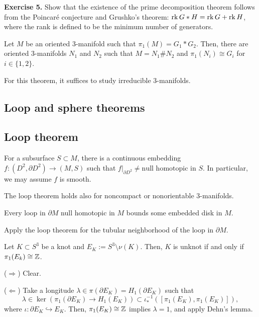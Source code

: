 \documentclass{../../small}
\begin{document}
\noindent\textbf{Exercise 5.} Show that the existence of the prime decomposition theorem follows from the Poincar\'e conjecture and Grushko's theorem: $\operatorname{rk} G*H=\operatorname{rk} G+\operatorname{rk} H$, where the rank is defined to be the minimum number of generators.

\begin{thm}
Let $M$ be an oriented 3-manifold such that $\pi_1(M)=G_1*G_2$.
Then, there are oriented 3-manifolds $N_1$ and $N_2$ such that $M=N_1\#N_2$ and $\pi_1(N_i)\cong G_i$ for $i\in\{1,2\}$.
\end{thm}
For this theorem, it suffices to study irreducible 3-manifolds.




\setcounter{section}{4}
\setcounter{subsection}{0}
\setcounter{thm}{0}
\subsection*{Loop and sphere theorems}
\subsection{Loop theorem}

\begin{thm}
For a subsurface $S\subset M$, there is a continuous embedding $f:(D^2,\partial D^2)\to(M,S)$ such that $f|_{\partial D^2}\ne\text{null homotopic in }S$.
In particular, we may assume $f$ is smooth.
\end{thm}

\begin{rmk*}
The loop theorem holds also for noncompact or nonorientable 3-manifolds.
\end{rmk*}

\begin{cor}
Every loop in $\partial M$ null homotopic in $M$ bounds some embedded disk in $M$.
\end{cor}
\begin{pf}
Apply the loop theorem for the tubular neighborhood of the loop in $\partial M$.
\end{pf}

\begin{thm}
Let $K\subset S^3$ be a knot and $E_K:=S^3\setminus\nu(K)$.
Then, $K$ is unknot if and only if $\pi_1(E_k)\cong\mathbb{Z}$.
\end{thm}
\begin{pf}
($\Rightarrow$)
Clear.

($\Leftarrow$)
Take a longitude $\lambda\in\pi(\partial E_K)=H_1(\partial E_K)$ such that
\[\lambda\in\ker(\pi_1(\partial E_K)\to H_1(E_K))\subset\iota_*^{-1}([\pi_1(E_K),\pi_1(E_K)]),\]
where $\iota:\partial E_K\hookrightarrow E_K$.
Then, $\pi_1(E_K)\cong\mathbb{Z}$ implies $\lambda=1$, and apply Dehn's lemma.
\end{pf}
\end{document}
